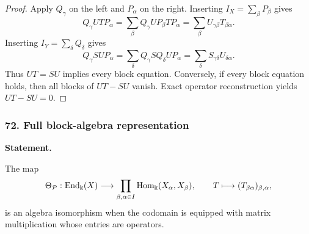 \begin{proof}
Apply \(Q_\gamma\) on the left and \(P_\alpha\) on the right.  Inserting \(I_X=\sum_\beta P_\beta\) gives
\[
Q_\gamma UTP_\alpha
=
\sum_\beta Q_\gamma UP_\beta TP_\alpha
=
\sum_\beta U_{\gamma\beta}T_{\beta\alpha}.
\]
Inserting \(I_Y=\sum_\delta Q_\delta\) gives
\[
Q_\gamma SUP_\alpha
=
\sum_\delta Q_\gamma SQ_\delta UP_\alpha
=
\sum_\delta S_{\gamma\delta}U_{\delta\alpha}.
\]
Thus \(UT=SU\) implies every block equation.  Conversely, if every block equation holds, then all blocks of \(UT-SU\) vanish.  Exact operator reconstruction yields \(UT-SU=0\).
\end{proof}
\subsubsection*{72. Full block-algebra representation}
\label{rec:PSC-I-T-BLOCK-ALGEBRA}
\textbf{Statement.}\par
The map
\[
\Theta_{\mathcal P}:\operatorname{End}_{\Bbbk}(X)
\longrightarrow
\prod_{\beta,\alpha\in I}\operatorname{Hom}_{\Bbbk}(X_\alpha,X_\beta),
\qquad
T\longmapsto(T_{\beta\alpha})_{\beta,\alpha},
\]
is an algebra isomorphism when the codomain is equipped with matrix multiplication whose entries are operators.

